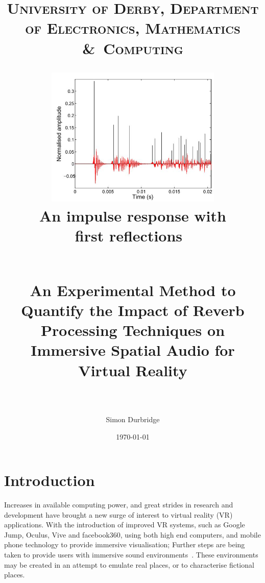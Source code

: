 \documentclass[paper=a4, fontsize=10pt, font=arial]{scrartcl} %
\title{	
\normalfont \normalsize 
\textsc{University of Derby, Department of Electronics, Mathematics \&\ Computing} \\ [25pt] %
\begin{figure}[H]
\centering
\includegraphics[width=0.75\textwidth]{impulseresponse.jpg}
\centering
\caption{An impulse response with first reflections~\cite{Mourik2013}}
\end{figure}
\horrule{0.5pt} \\[0.4cm] %
\huge An Experimental Method to Quantify the Impact of Reverb Processing Techniques on Immersive Spatial Audio for Virtual Reality \\ %
\horrule{2pt} \\[0.5cm] %
}
\author{Simon Durbridge} %
\date{\normalsize\today} %
\numberwithin{equation}{section} %
\numberwithin{figure}{section} %
\numberwithin{table}{section} %
\begin{document}
\maketitle %


\tableofcontents

\newpage


\listoffigures

\newpage





\section{Introduction}

Increases in available computing power, and great strides in research and development have brought a new surge of interest to virtual reality (VR) applications. 
With the introduction of improved VR systems, such as Google Jump, Oculus, Vive and facebook360, using both high end computers, and mobile phone technology to provide immersive visualisation; Further steps are being taken to provide users with immersive sound environments~\cite{OculusCo41online}. 
These environments may be created in an  attempt to emulate real places, or to characterise fictional places.\par
\end{document}
